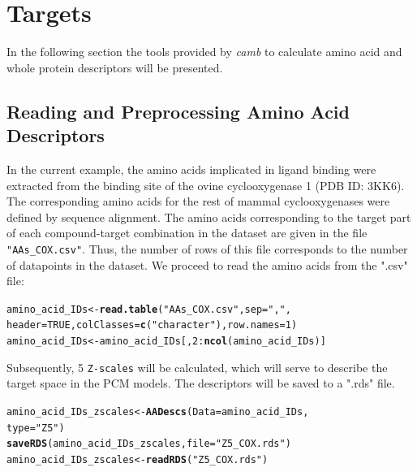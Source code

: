 \documentclass[twoside,a4wide,12pt]{article}\usepackage[]{graphicx}\usepackage[]{color}
\makeatletter
\newcommand{\hlnum}[1]{\textcolor[rgb]{0.686,0.059,0.569}{#1}}%
\newcommand{\hlstr}[1]{\textcolor[rgb]{0.192,0.494,0.8}{#1}}%
\newcommand{\hlopt}[1]{\textcolor[rgb]{0,0,0}{#1}}%
\newcommand{\hlstd}[1]{\textcolor[rgb]{0.345,0.345,0.345}{#1}}%
\newcommand{\hlkwb}[1]{\textcolor[rgb]{0.69,0.353,0.396}{#1}}%
\newcommand{\hlkwc}[1]{\textcolor[rgb]{0.333,0.667,0.333}{#1}}%
\newcommand{\hlkwd}[1]{\textcolor[rgb]{0.737,0.353,0.396}{\textbf{#1}}}%
\newenvironment{kframe}{%
 \def\at@end@of@kframe{}%
 \ifinner\ifhmode%
  \def\at@end@of@kframe{\end{minipage}}%
  \begin{minipage}{\columnwidth}%
 \fi\fi%
 \def\FrameCommand##1{\hskip\@totalleftmargin \hskip-\fboxsep
 \colorbox{shadecolor}{##1}\hskip-\fboxsep
     \hskip-\linewidth \hskip-\@totalleftmargin \hskip\columnwidth}%
 \MakeFramed {\advance\hsize-\width
   \@totalleftmargin\z@ \linewidth\hsize
   \@setminipage}}%
 {\par\unskip\endMakeFramed%
 \at@end@of@kframe}
\newenvironment{knitrout}{}{} %
\makeatother
\begin{document}
\section{Targets}

In the following section the tools provided by {\it camb} to calculate amino acid and whole protein descriptors will be presented.

\subsection{Reading and Preprocessing Amino Acid Descriptors}
In the current example, the amino acids implicated in ligand binding were extracted from the binding site of the ovine cyclooxygenase 1 (PDB ID: 3KK6). The corresponding amino acids for the rest of mammal cyclooxygenases were defined by sequence alignment.
The amino acids corresponding to the target part of each compound-target combination in the dataset are given in the file \verb|"AAs_COX.csv"|. Thus, the number of rows of this file corresponds to the number of datapoints in the dataset.
We proceed to read the amino acids from the ".csv" file:
\begin{knitrout}
\color{fgcolor}\begin{kframe}
\begin{alltt}
\hlstd{amino_acid_IDs} \hlkwb{<-} \hlkwd{read.table}\hlstd{(}\hlstr{"AAs_COX.csv"}\hlstd{,} \hlkwc{sep} \hlstd{=} \hlstr{","}\hlstd{,}
    \hlkwc{header} \hlstd{=} \hlnum{TRUE}\hlstd{,} \hlkwc{colClasses} \hlstd{=} \hlkwd{c}\hlstd{(}\hlstr{"character"}\hlstd{),} \hlkwc{row.names} \hlstd{=} \hlnum{1}\hlstd{)}
\hlstd{amino_acid_IDs} \hlkwb{<-} \hlstd{amino_acid_IDs[,} \hlnum{2}\hlopt{:}\hlkwd{ncol}\hlstd{(amino_acid_IDs)]}
\end{alltt}
\end{kframe}
\end{knitrout}
Subsequently, 5 \verb|Z-scales| will be calculated, which will serve to describe the target space in the PCM models.
The descriptors will be saved to a ".rds" file.
\begin{knitrout}
\color{fgcolor}\begin{kframe}
\begin{alltt}
\hlstd{amino_acid_IDs_zscales} \hlkwb{<-} \hlkwd{AADescs}\hlstd{(}\hlkwc{Data} \hlstd{= amino_acid_IDs,}
    \hlkwc{type} \hlstd{=} \hlstr{"Z5"}\hlstd{)}
\hlkwd{saveRDS}\hlstd{(amino_acid_IDs_zscales,} \hlkwc{file} \hlstd{=} \hlstr{"Z5_COX.rds"}\hlstd{)}
\hlstd{amino_acid_IDs_zscales} \hlkwb{<-} \hlkwd{readRDS}\hlstd{(}\hlstr{"Z5_COX.rds"}\hlstd{)}
\end{alltt}
\end{kframe}
\end{knitrout}
\end{document}
